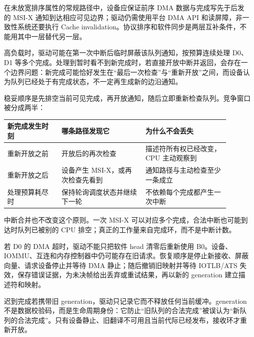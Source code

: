 在未放宽排序属性的常规路径中，设备应保证前序 DMA 数据与完成写先于后发的 MSI-X 通知到达相应可见边界；驱动仍需使用平台 DMA API 和读屏障，非一致性系统还要执行 Cache invalidation。协议排序和软件同步是两层互补条件，不能用其中一层替代另一层。


高负载时，驱动可能在第一次中断后临时屏蔽该队列通知，按预算连续处理 D0、D1 等多个完成。处理到暂时看不到新完成时，若直接开放中断并返回，会存在一个边界问题：新完成可能恰好发生在“最后一次检查”与“重新开放”之间，而设备认为队列已经处于有完成状态，不一定再生成新的边沿通知。

稳妥顺序是先排空当前可见完成，再开放通知，随后立即重新检查队列。竞争窗口被分成两半：

\begin{longtable}{L{0.22\linewidth}L{0.34\linewidth}L{0.34\linewidth}}
\toprule
新完成发生时刻 & 哪条路径发现它 & 为什么不会丢失 \\
\midrule
重新开放之前 & 开放后的再次检查 & 描述符所有权已经改变，CPU 主动观察到 \\
重新开放之后 & 设备产生 MSI-X，或再次检查先看到 & 通知路径与主动检查至少一条成立 \\
处理预算耗尽时 & 保持轮询调度状态并继续下一轮 & 不依赖每个完成都产生一次中断 \\
\bottomrule
\end{longtable}

中断合并也不改变这个原则。一次 MSI-X 可以对应多个完成，合法中断也可能到达时队列已被别的 CPU 排空；真正的工作量来自完成环，而不是中断计数。


若 D0 的 DMA 超时，驱动不能只把软件 head 清零后重新使用 B0。设备、IOMMU、互连和内存控制器中仍可能存在旧请求。恢复顺序是停止新接收、屏蔽向量、请求设备停止并等待 DMA 静止；随后撤销旧映射并等待 IOTLB/ATS 失效，保存错误证据，为未决帧给出丢弃或重试结果，再以新的 generation 建立描述符和映射。

迟到完成若携带旧 generation，驱动只记录它而不释放任何当前缓冲。generation 不是数据校验码，而是生命周期身份：它防止“旧队列的合法完成”被误认为“新队列的合法完成”。只有设备静止、旧翻译不可用且当前代际已经发布，接收环才重新开放。
